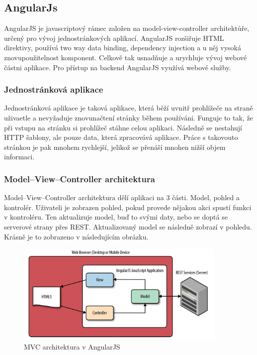 \documentclass[czech,master,public,dept460,male,cpdeclaration,twoside]{diploma}
\begin{document}
\subsection{AngularJs}
AngularJS je javascriptový rámec založen na model-view-controller architektůře, určený pro vývoj jednostránkových aplikací. AngularJS rozšiřuje HTML direktivy, používá two way data binding, dependency injection a u něj vysoká znovupoužitelnost komponent. Celkově tak usnadňuje a urychluje vývoj webové částni aplikace. Pro přístup na backend AngularJS využívá webové služby. \cite{coJeAngular}

\subsubsection{Jednostránková aplikace}
Jednostránková aplikace je taková aplikace, která běží uvnitř prohlížeče na straně uživaetle a nevyžaduje znovunačtení stránky během používáni. Funguje to tak, že při vstupu na stránku si prohlížeč stáhne celou aplikaci. Následně se nestahují HTTP šablony, ale pouze data, která zpracovává aplikace. Práce s takovouto stránkou je pak mnohem rychlejší, jelikož se přenáší mnohen nižší objem informaci. \cite{SPA}

\subsubsection{Model–View–Controller architektura}
Model–View–Controller architektura dělí aplikaci na 3 části. Model, pohled a kontrolér. Uživateli je zobrazen pohled, pokud provede nějakou akci spustí funkci v kontroléru. Ten aktualizuje model, buď to svými daty, nebo se doptá se serverové strany přes REST. Aktualizovaný model se následně zobrazí v pohledu. Krásně je to zobrazeno v následujícím obrázku.
\begin{figure}[H]
\centering\includegraphics[width=0.9\textwidth]{Figures/MVC.png}\caption{MVC architektura v AngularJS}
\end{figure}
\end{document}
